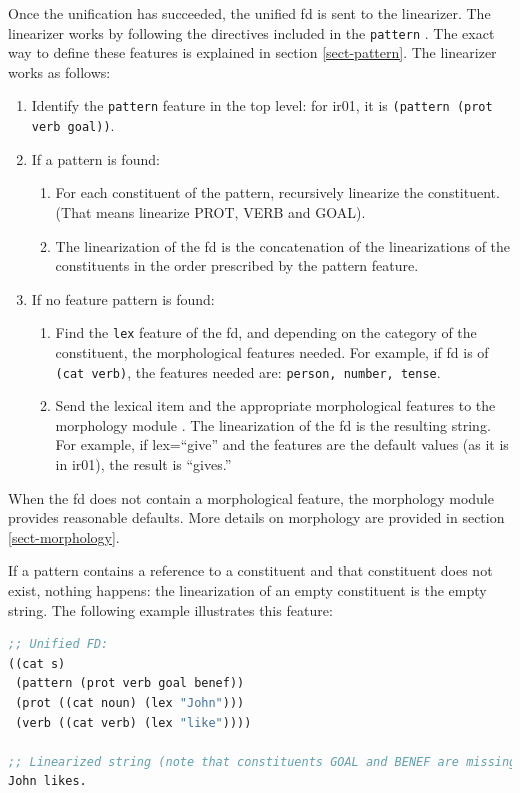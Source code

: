 \documentclass[10pt,a4paper]{report}
\begin{document}
Once the unification has succeeded, the unified fd is sent to the
linearizer.  The linearizer works by following the directives included in
the {\tt pattern} .  The exact way to define these
features is explained in section \ref{sect-pattern}.  The linearizer works
as follows:
\begin{enumerate}
\item Identify the {\tt pattern} feature in the top level:  for ir01, it is
{\tt (pattern (prot verb goal))}.

\item If a pattern is found:
\begin{enumerate}
\item For each constituent of the pattern, recursively linearize the constituent.
(That means linearize PROT, VERB and GOAL).

\item The linearization of the fd is the concatenation of the linearizations of
the constituents in the order prescribed by the pattern feature.
\end{enumerate}

\item If no feature pattern is found:
\begin{enumerate}
\item Find the {\tt lex} feature of the fd, and depending on the category of the
constituent, the morphological features needed.  For example, if fd is of
{\tt (cat verb)}, the features needed are: {\tt person, number, tense}.  

\item Send the lexical item and the appropriate morphological features to the
morphology module .  The linearization of the fd is the
resulting string.  For example, if lex=``give'' and the features are the
default values (as it is in ir01), the result is ``gives.''
\end{enumerate}
\end{enumerate}


When the fd does not contain a morphological feature, the morphology module
provides reasonable defaults.  More details on morphology are provided in
section \ref{sect-morphology}.

If a pattern contains a reference to a constituent and that constituent
does not exist, nothing happens: the linearization of an empty constituent
is the empty string.  The following example illustrates this feature:

\begin{lstlisting}[language=Lisp]
;; Unified FD:
((cat s)
 (pattern (prot verb goal benef))
 (prot ((cat noun) (lex "John")))
 (verb ((cat verb) (lex "like"))))

;; Linearized string (note that constituents GOAL and BENEF are missing):
John likes.
\end{lstlisting}
\end{document}
